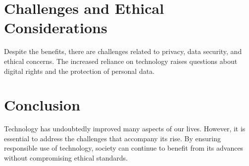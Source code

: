 \documentclass[12pt]{article}  %
\begin{document}
	\section{Challenges and Ethical Considerations}
	Despite the benefits, there are challenges related to privacy, data security, and ethical concerns. The increased reliance on technology raises questions about digital rights and the protection of personal data.
	
	\section{Conclusion}
	Technology has undoubtedly improved many aspects of our lives. However, it is essential to address the challenges that accompany its rise. By ensuring responsible use of technology, society can continue to benefit from its advances without compromising ethical standards.
	
	
	
\end{document}
